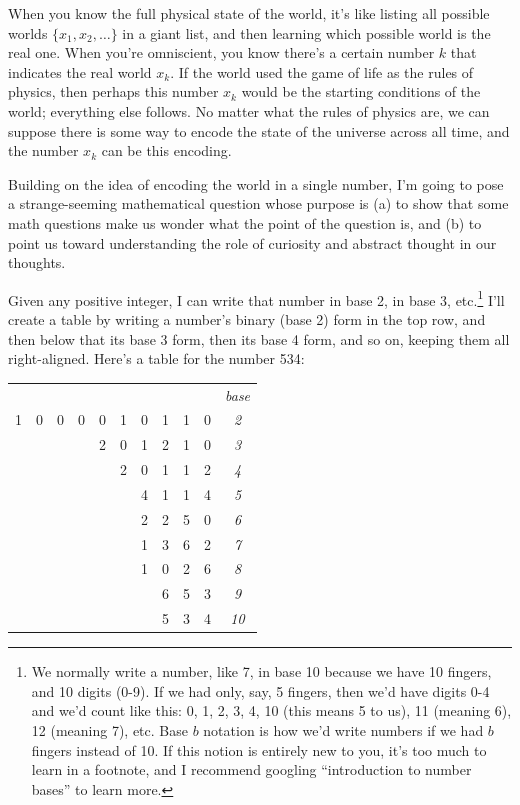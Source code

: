 \documentclass[11pt, oneside]{article}   	%
\begin{document}
When you know the full physical state of the world, it's
like listing all possible worlds $\{x_1, x_2, \ldots\}$ in a giant list, and
then learning which possible world is the real one. When you're omniscient, you
know there's a certain number $k$ that indicates the real world $x_k$.
If the world used the game of life as the rules of physics, then perhaps this
number $x_k$ would be the starting conditions of the world; everything else
follows. No matter what the rules of physics are, we can suppose there is some
way to encode the state of the universe across all time, and the number
$x_k$ can be this encoding.

Building on the idea of encoding the world in a single number,
I'm going to pose a strange-seeming mathematical question whose purpose is
(a) to show that some math questions make us wonder what the
point of the question is, and (b) to point us toward understanding the role of
curiosity and abstract thought in our thoughts.

Given any positive integer, I can write that number in base 2, in base 3,
etc.\footnote{We normally write a number, like 7, in base 10 because we have 10
fingers, and 10 digits (0-9). If we had only, say, 5 fingers, then we'd have
digits 0-4 and we'd count like this: 0, 1, 2, 3, 4, 10 (this means 5 to us), 11
(meaning 6), 12 (meaning 7), etc. Base $b$ notation is how we'd write numbers if
we had $b$ fingers instead of 10. If this notion is entirely new to you, it's
too much to learn in a footnote, and I recommend googling ``introduction to
number bases'' to learn more.}
I'll create a table by writing a number's binary (base 2)
form in the top row,
and then below that its base 3 form, then its base 4 form, and so on, keeping
them all right-aligned. Here's a table for the number 534:

\begin{center}
\begin{tabular}{cccccccccc|c}
  &   &   &   &   &   &   &   &   &   &\em base \\
1 & 0 & 0 & 0 & 0 & 1 & 0 & 1 & 1 & 0 & \it 2 \\
  &   &   &   & 2 & 0 & 1 & 2 & 1 & 0 & \it 3 \\
  &   &   &   &   & 2 & 0 & 1 & 1 & 2 & \it 4 \\
  &   &   &   &   &   & 4 & 1 & 1 & 4 & \it 5 \\
  &   &   &   &   &   & 2 & 2 & 5 & 0 & \it 6 \\
  &   &   &   &   &   & 1 & 3 & 6 & 2 & \it 7 \\
  &   &   &   &   &   & 1 & 0 & 2 & 6 & \it 8 \\
  &   &   &   &   &   &   & 6 & 5 & 3 & \it 9 \\
  &   &   &   &   &   &   & 5 & 3 & 4 & \it 10 \\
\end{tabular}
\end{center}
\end{document}
